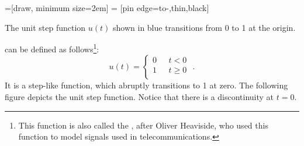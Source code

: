 
=[draw, minimum size=2em]
 = [pin edge={to-,thin,black}]
\begin{marginfigure}[-3cm]
\begin{center}

\end{center}
\caption{The unit step function $u(t)$ shown in blue transitions from 0 to 1 at the origin.}
\end{marginfigure}


 can be defined as
follows\footnote{This function is also called the
  , after Oliver
  Heaviside, who used this function to model signals used in
  telecommunications.}:
\begin{equation}
u(t) = \left\{\begin{array}{cl}
0 &~~~ t < 0 \\
1 &~~~ t \ge 0 \\
\end{array}
\right. \,\,.
\end{equation}
It is a step-like function, which abruptly transitions to 1 at
zero. The following figure depicts the unit step function. Notice
that there is a discontinuity at $t=0$. %

